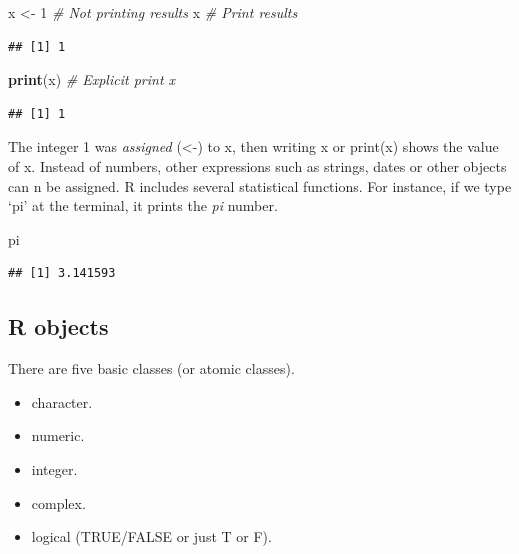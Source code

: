 \documentclass[12pt,graybox,envcountchap,sectrefs]{krantz}
\makeatletter
\newenvironment{Shaded}{\begin{snugshade}}{\end{snugshade}}
\newcommand{\KeywordTok}[1]{\textcolor[rgb]{0.13,0.29,0.53}{\textbf{#1}}}
\newcommand{\DecValTok}[1]{\textcolor[rgb]{0.00,0.00,0.81}{#1}}
\newcommand{\StringTok}[1]{\textcolor[rgb]{0.31,0.60,0.02}{#1}}
\newcommand{\CommentTok}[1]{\textcolor[rgb]{0.56,0.35,0.01}{\textit{#1}}}
\newcommand{\NormalTok}[1]{#1}
\providecommand{\tightlist}{%
  \setlength{\itemsep}{0pt}\setlength{\parskip}{0pt}}
\newenvironment{kframe}{%
\medskip{}
\setlength{\fboxsep}{.8em}
 \def\at@end@of@kframe{}%
 \ifinner\ifhmode%
  \def\at@end@of@kframe{\end{minipage}}%
  \begin{minipage}{\columnwidth}%
 \fi\fi%
 \def\FrameCommand##1{\hskip\@totalleftmargin \hskip-\fboxsep
 \colorbox{shadecolor}{##1}\hskip-\fboxsep
     \hskip-\linewidth \hskip-\@totalleftmargin \hskip\columnwidth}%
 \MakeFramed {\advance\hsize-\width
   \@totalleftmargin\z@ \linewidth\hsize
   \@setminipage}}%
 {\par\unskip\endMakeFramed%
 \at@end@of@kframe}
\renewenvironment{Shaded}{\begin{kframe}}{\end{kframe}}
\theoremstyle{definition}
\theoremstyle{definition}
\theoremstyle{definition}
\theoremstyle{remark}
\makeatother
\begin{document}
\begin{Shaded}
\begin{Highlighting}[]
\NormalTok{x <-}\StringTok{ }\DecValTok{1}   \CommentTok{# Not printing  results}
\NormalTok{x        }\CommentTok{# Print results}
\end{Highlighting}
\end{Shaded}

\begin{verbatim}
## [1] 1
\end{verbatim}

\begin{Shaded}
\begin{Highlighting}[]
\KeywordTok{print}\NormalTok{(x) }\CommentTok{# Explicit print x}
\end{Highlighting}
\end{Shaded}

\begin{verbatim}
## [1] 1
\end{verbatim}

The integer 1 was \emph{assigned} (\textless{}-) to x, then writing x or
print(x) shows the value of x. Instead of numbers, other expressions
such as strings, dates or other objects can n be assigned. R includes
several statistical functions. For instance, if we type `pi' at the
terminal, it prints the \emph{pi} number.

\begin{Shaded}
\begin{Highlighting}[]
\NormalTok{pi}
\end{Highlighting}
\end{Shaded}

\begin{verbatim}
## [1] 3.141593
\end{verbatim}

\subsection{R objects}\label{r-objects}

There are five basic classes (or atomic classes).

\begin{itemize}
\tightlist
\item
  character.
\item
  numeric.
\item
  integer.
\item
  complex.
\item
  logical (TRUE/FALSE or just T or F).
\end{itemize}
\end{document}
